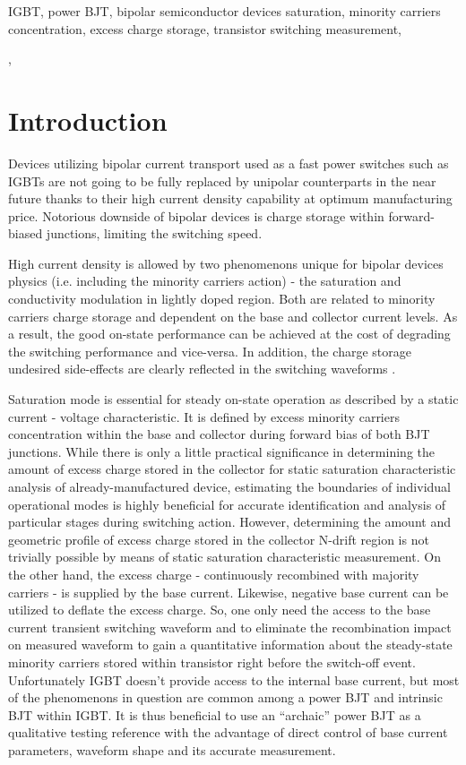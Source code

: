 \documentclass[conference]{IEEEtran}
\begin{document}
\begin{IEEEkeywords}
IGBT, power BJT, bipolar semiconductor devices saturation, minority carriers concentration, excess charge storage, transistor switching measurement, 
\end{IEEEkeywords}

,
\section{Introduction}
Devices utilizing bipolar current transport used as a fast power switches such as IGBTs are not going to be fully replaced by unipolar counterparts in the near future thanks to their high current density capability at optimum manufacturing price. Notorious downside of bipolar devices is charge storage  within forward-biased junctions, limiting the switching speed.

High current density is allowed by two phenomenons unique for bipolar devices physics (i.e. including the minority carriers action) - the saturation and conductivity modulation in lightly doped region. Both are related to minority carriers charge storage and dependent on the base and collector current levels. As a result, the good on-state performance can be achieved at the cost of degrading the switching performance and vice-versa. In addition, the charge storage undesired side-effects are clearly reflected in the switching waveforms \cite{chenming}.


Saturation mode is essential for steady on-state operation as described by a static current - voltage characteristic. It is defined by excess minority carriers concentration within the base and collector during forward bias of both BJT junctions.
While there is only a little practical significance in determining the amount of excess charge stored in the collector for static saturation characteristic analysis of already-manufactured device, estimating the boundaries of individual operational modes is highly beneficial for accurate identification and analysis of particular stages during switching action.
However, determining the amount and geometric profile of excess charge stored in the collector N-drift region is not trivially possible by means of static saturation characteristic measurement.
On the other hand, the excess charge - continuously recombined with majority carriers - is supplied by the base current. Likewise, negative base current can be utilized to deflate the excess charge. So, one only need the access to the base current transient switching waveform and to eliminate the recombination impact on measured waveform to gain a quantitative information about the steady-state minority carriers stored within transistor right before the switch-off event. Unfortunately IGBT doesn't provide access to the internal base current, but most of the phenomenons in question are common among a power BJT and intrinsic BJT within IGBT. It is thus beneficial to use an ``archaic'' power BJT as a qualitative testing reference with the advantage of direct control of base current parameters, waveform shape and its accurate measurement.
\end{document}
